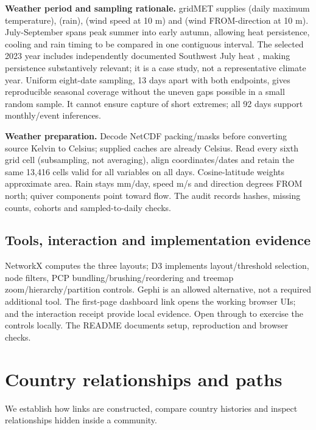 \documentclass[conference,a4paper]{IEEEtran}
\begin{document}
\textbf{Weather period and sampling rationale.} gridMET \cite{ref1} supplies  (daily maximum temperature),  (rain),  (wind speed at 10 m) and  (wind FROM-direction at 10 m). July-September spans peak summer into early autumn, allowing heat persistence, cooling and rain timing to be compared in one contiguous interval. The selected 2023 year includes independently documented Southwest July heat \cite{ref9}, making persistence substantively relevant; it is a case study, not a representative climate year. Uniform eight-date sampling, 13 days apart with both endpoints, gives reproducible seasonal coverage without the uneven gaps possible in a small random sample. It cannot ensure capture of short extremes; all 92 days support monthly/event inferences.

\textbf{Weather preparation.} Decode NetCDF packing/masks before converting source Kelvin to Celsius; supplied caches are already Celsius. Read every sixth grid cell (subsampling, not averaging), align coordinates/dates and retain the same 13,416 cells valid for all variables on all days. Cosine-latitude weights approximate area. Rain stays mm/day, speed m/s and direction degrees FROM north; quiver components point toward flow. The audit records hashes, missing counts, cohorts and sampled-to-daily checks.



\subsection{Tools, interaction and implementation evidence}

NetworkX \cite{ref3} computes the three layouts; D3 \cite{ref4} implements layout/threshold selection, node filters, PCP bundling/brushing/reordering and treemap zoom/hierarchy/partition controls. Gephi \cite{ref5} is an allowed alternative, not a required additional tool. The first-page dashboard link opens the working browser UIs;  and the interaction receipt provide local evidence. Open  through   to exercise the controls locally. The README documents setup, reproduction and browser checks.



\section{Country relationships and paths}

We establish how links are constructed, compare country histories and inspect relationships hidden inside a community.
\end{document}
